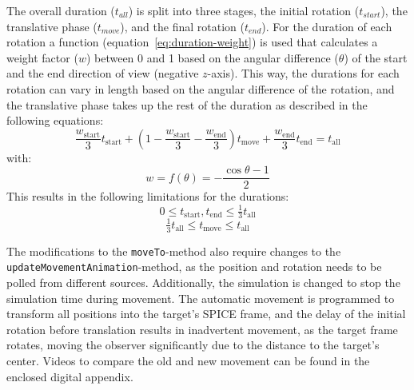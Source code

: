 The overall duration ($t_{all}$) is split into three stages, the initial rotation ($t_{start}$), the translative phase
($t_{move}$), and the final rotation ($t_{end}$).
For the duration of each rotation a function (equation~\ref{eq:duration-weight}) is used that calculates a weight
factor ($w$) between 0 and 1 based on the angular difference ($\theta$) of the start and the end direction of view
(negative $z$-axis).
This way, the durations for each rotation can vary in length based on the angular difference of the rotation, and the
translative phase takes up the rest of the duration as described in the following equations:
\begin{equation}
    \label{eq:duration-timings}
    \frac{w_{\mathrm{start}}}{3} t_{\mathrm{start}} + (1 - \frac{w_{\mathrm{start}}}{3} - \frac{w_{\mathrm{end}}}{3})
    t_{\mathrm{move}} +
    \frac{w_{\mathrm{end}}}{3} t_{\mathrm{end}} = t_{\mathrm{all}}
\end{equation}
with:
\begin{equation}
    \label{eq:duration-weight}
    w = f(\theta) = - \frac{\cos{\theta} - 1}{2}
\end{equation}
This results in the following limitations for the durations:
\begin{equation}
    \label{eq:duration-result-rot}
    0 \leq t_{\mathrm{start}}, t_{\mathrm{end}} \leq \tfrac{1}{3} t_{\mathrm{all}}
\end{equation}
\begin{equation}
    \label{eq:duration-result-mov}
    \tfrac{1}{3} t_{\mathrm{all}} \leq t_{\mathrm{move}} \leq t_{\mathrm{all}}
\end{equation}

The modifications to the \texttt{moveTo}-method also require changes to the
\texttt{updateMovementAnimation}-method, as the position and rotation needs to be polled from different sources.
Additionally, the simulation is changed to stop the simulation time during movement.
The automatic movement is programmed to transform all positions into the target's SPICE frame, and the delay of the
initial rotation before translation results in inadvertent movement, as the target frame rotates, moving the observer
significantly due to the distance to the target's center.
Videos to compare the old and new movement can be found in the enclosed digital appendix\footnotemark.

